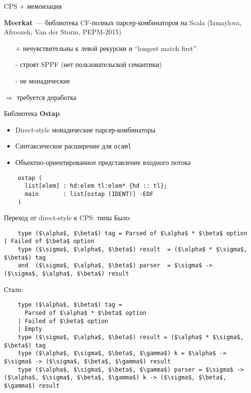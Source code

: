 \documentclass[10pt, mathserif]{beamer}
\theoremstyle{definition}
\begin{document}
\begin{frame}[fragile]{CPS + мемоизация}

  \textbf{Meerkat}~--- библиотека CF-полных парсер-комбинаторов на Scala (Izmaylova, Afroozeh, Van der Storm, PEPM-2015)
  \vskip3mm

  \begin{itemize}
    \item[+] нечувствительны к левой рекурсии и ``longest match first''
    \item[-] строят SPPF (нет пользовательской семантики)
    \item[-] не монадические
  \end{itemize}
  \vskip3mm

  $\Rightarrow$ требуется доработка

\end{frame}

\begin{frame}[fragile]{Библиотека \textbf{Ostap}}
  \begin{itemize}
    \item Direct-style монадические парсер-комбинаторы
    \item Синтаксическое расширение для \texttt{ocaml}
    \item Объектно-ориентированное представление входного потока
  \end{itemize}
  \vskip3mm
  \begin{lstlisting}
    ostap (
      list[elem] : hd:elem tl:elem* {hd :: tl};
      main       : list[ostap (IDENT)] -EOF
    )
  \end{lstlisting}

\end{frame}

\begin{frame}[fragile]{Переход от direct-style к CPS: типы}
  Было:
  \begin{lstlisting}
    type ($\alpha$, $\beta$) tag = Parsed of $\alpha$ * $\beta$ option | Failed of $\beta$ option
    type ($\sigma$, $\alpha$, $\beta$) result  = ($\alpha$ * $\sigma$, $\beta$) tag
    and  ($\sigma$, $\alpha$, $\beta$) parser  = $\sigma$ -> ($\sigma$, $\alpha$, $\beta$) result
  \end{lstlisting}

  Стало:
  \begin{lstlisting}
    type ($\alpha$, $\beta$) tag =
      Parsed of $\alpha$ * $\beta$ option
    | Failed of $\beta$ option
    | Empty
    type ($\sigma$, $\alpha$, $\beta$) result = ($\alpha$ * $\sigma$, $\beta$) tag
    type ($\alpha$, $\sigma$, $\beta$, $\gamma$) k = $\alpha$ -> $\sigma$ -> ($\sigma$, $\beta$, $\gamma$) result
    type ($\alpha$, $\sigma$, $\beta$, $\gamma$) parser = $\sigma$ -> ($\alpha$, $\sigma$, $\beta$, $\gamma$) k -> ($\sigma$, $\beta$, $\gamma$) result
  \end{lstlisting}

\end{frame}
\end{document}
